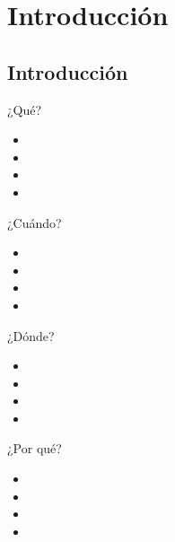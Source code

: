 \section{Introducción}

\subsection{Introducción}
\begin{frame}{¿Qué?}
  \begin{itemize}
    \item 
    \item 
    \item 
    \item 
  \end{itemize}
\end{frame}

\begin{frame}{¿Cuándo?}
  \begin{itemize}
    \item 
    \item 
    \item 
    \item 
  \end{itemize}
\end{frame}

\begin{frame}{¿Dónde?}
  \begin{itemize}
    \item 
    \item 
    \item 
    \item 
  \end{itemize}
\end{frame}

\begin{frame}{¿Por qué?}
  \begin{itemize}
    \item 
    \item 
    \item 
    \item 
  \end{itemize}
\end{frame}
